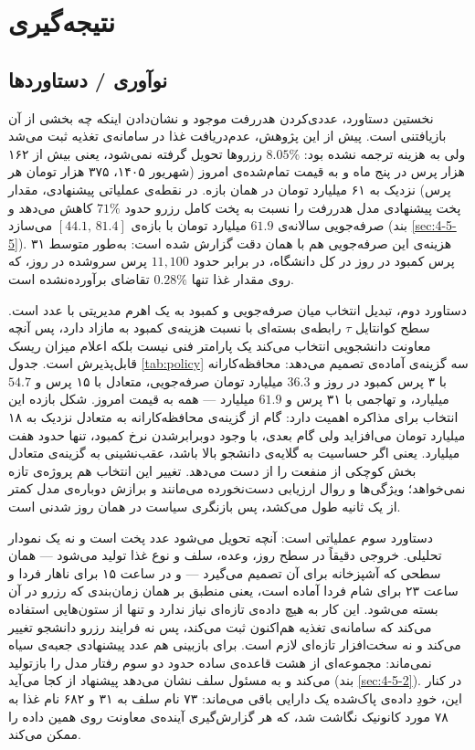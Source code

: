 \section{نتیجه‌گیری}
\label{sec:5-2}

\subsection{نوآوری / دستاوردها}
\label{sec:5-2-1}

نخستین دستاورد، عددی‌کردن هدررفت موجود و نشان‌دادن اینکه چه بخشی از آن بازیافتنی است.
پیش از این پژوهش، عدم‌دریافت غذا در سامانه‌ی تغذیه ثبت می‌شد ولی به هزینه ترجمه نشده
بود: $8.05\%$ رزروها تحویل گرفته نمی‌شود، یعنی بیش از ۱۶۲ هزار پرس در پنج ماه و به
قیمت تمام‌شده‌ی امروز (شهریور ۱۴۰۵، ۳۷۵ هزار تومان هر پرس) نزدیک به ۶۱ میلیارد تومان
در همان بازه. در نقطه‌ی عملیاتی پیشنهادی، مقدار پخت پیشنهادی مدل هدررفت را نسبت به پخت
کامل رزرو حدود $71\%$ کاهش می‌دهد و صرفه‌جویی سالانه‌ی $61.9$ میلیارد تومان با بازه‌ی
$[44.1,\,81.4]$ می‌سازد (بند \ref{sec:4-5-5}). هزینه‌ی این صرفه‌جویی هم با همان دقت
گزارش شده است: به‌طور متوسط ۳۱ پرس کمبود در روز در کل دانشگاه، در برابر حدود
$11{,}100$ پرس سرو‌شده در روز،
که روی مقدار غذا تنها $0.28\%$ تقاضای برآورده‌نشده است.

دستاورد دوم، تبدیل انتخاب میان صرفه‌جویی و کمبود به یک اهرم مدیریتی با عدد است. سطح
کوانتایل $\tau$ رابطه‌ی بسته‌ای با نسبت هزینه‌ی کمبود به مازاد دارد، پس آنچه معاونت
دانشجویی انتخاب می‌کند یک پارامتر فنی نیست بلکه اعلام میزان ریسک قابل‌پذیرش است. جدول
\ref{tab:policy} سه گزینه‌ی آماده‌ی تصمیم می‌دهد: محافظه‌کارانه با ۳ پرس کمبود در روز و
$36.3$ میلیارد تومان صرفه‌جویی، متعادل با ۱۵ پرس و $54.7$ میلیارد، و تهاجمی با ۳۱ پرس و
$61.9$ میلیارد — همه به قیمت امروز. شکل بازده این انتخاب برای مذاکره اهمیت دارد: گام
از گزینه‌ی محافظه‌کارانه به متعادل نزدیک به ۱۸ میلیارد تومان می‌افزاید ولی گام بعدی، با وجود
دوبرابرشدن نرخ کمبود، تنها حدود هفت میلیارد. یعنی اگر حساسیت به گلایه‌ی دانشجو بالا
باشد، عقب‌نشینی به گزینه‌ی متعادل بخش کوچکی از منفعت را از دست می‌دهد. تغییر این انتخاب
هم پروژه‌ی تازه نمی‌خواهد؛ ویژگی‌ها و روال ارزیابی دست‌نخورده می‌مانند و برازش دوباره‌ی
مدل کمتر از یک ثانیه طول می‌کشد، پس بازنگری سیاست در همان روز شدنی است.

دستاورد سوم عملیاتی است: آنچه تحویل می‌شود عدد پخت است و نه یک نمودار تحلیلی. خروجی
دقیقاً در سطح روز، وعده، سلف و نوع غذا تولید می‌شود — همان سطحی که آشپزخانه برای آن
تصمیم می‌گیرد — و در ساعت ۱۵ برای ناهار فردا و ساعت ۲۳ برای شام فردا آماده است، یعنی
منطبق بر همان زمان‌بندی که رزرو در آن بسته می‌شود. این کار به هیچ داده‌ی تازه‌ای نیاز
ندارد و تنها از ستون‌هایی استفاده می‌کند که سامانه‌ی تغذیه هم‌اکنون ثبت می‌کند، پس نه
فرایند رزرو دانشجو تغییر می‌کند و نه سخت‌افزار تازه‌ای لازم است. برای بازبینی هم عدد
پیشنهادی جعبه‌ی سیاه نمی‌ماند: مجموعه‌ای از هشت قاعده‌ی ساده حدود دو سوم رفتار مدل را
بازتولید می‌کند و به مسئول سلف نشان می‌دهد پیشنهاد از کجا می‌آید (بند
\ref{sec:4-5-2}). در کنار این، خودِ داده‌ی پاک‌شده یک دارایی باقی می‌ماند: ۷۳ نام سلف
به ۳۱ و ۶۸۲ نام غذا به ۷۸ مورد کانونیک نگاشت شد، که هر گزارش‌گیری آینده‌ی معاونت روی
همین داده را ممکن می‌کند.


